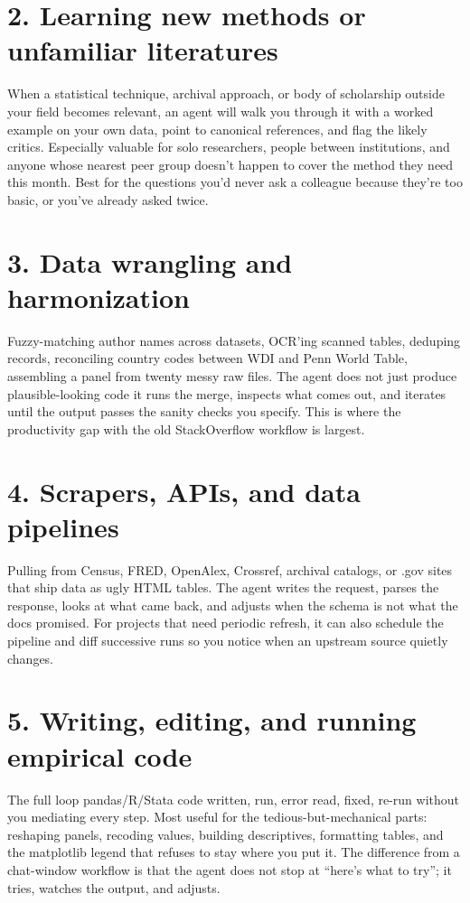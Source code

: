 \documentclass[11pt]{article}
\begin{document}
\section*{2. Learning new methods or unfamiliar literatures}

When a statistical technique, archival approach, or body of scholarship outside your field becomes relevant, an agent will walk you through it with a worked example on your own data, point to canonical references, and flag the likely critics. Especially valuable for solo researchers, people between institutions, and anyone whose nearest peer group doesn't happen to cover the method they need this month. Best for the questions you'd never ask a colleague because they're too basic, or you've already asked twice.

\section*{3. Data wrangling and harmonization}

Fuzzy-matching author names across datasets, OCR'ing scanned tables, deduping records, reconciling country codes between WDI and Penn World Table, assembling a panel from twenty messy raw files. The agent does not just produce plausible-looking code \textemdash{} it runs the merge, inspects what comes out, and iterates until the output passes the sanity checks you specify. This is where the productivity gap with the old StackOverflow workflow is largest.

\section*{4. Scrapers, APIs, and data pipelines}

Pulling from Census, FRED, OpenAlex, Crossref, archival catalogs, or .gov sites that ship data as ugly HTML tables. The agent writes the request, parses the response, looks at what came back, and adjusts when the schema is not what the docs promised. For projects that need periodic refresh, it can also schedule the pipeline and diff successive runs so you notice when an upstream source quietly changes.

\section*{5. Writing, editing, and running empirical code}

The full loop \textemdash{} pandas/R/Stata code written, run, error read, fixed, re-run \textemdash{} without you mediating every step. Most useful for the tedious-but-mechanical parts: reshaping panels, recoding values, building descriptives, formatting tables, and the matplotlib legend that refuses to stay where you put it. The difference from a chat-window workflow is that the agent does not stop at ``here's what to try''; it tries, watches the output, and adjusts.
\end{document}
